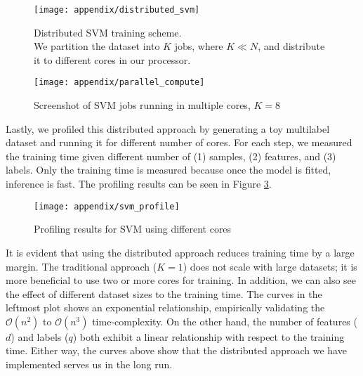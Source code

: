 \begin{figure}[t]
  \centering
    \texttt{[image: appendix/distributed\_svm]}
    \caption[Distributed SVM training scheme]{Distributed SVM training
        scheme.\\ We partition the dataset into $K$ jobs, where $K\ll N$, and
    distribute it to different cores in our processor.}
  \label{demo:distributed_svm}
\end{figure}

\begin{figure}[!h]
  \centering
    \texttt{[image: appendix/parallel\_compute]}
    \caption[Screenshot of SVM jobs running in multiple cores]{Screenshot of
    SVM jobs running in multiple cores, $K=8$}
  \label{demo:screenshot}
\end{figure}

\par Lastly, we profiled this distributed approach by generating a toy multilabel
dataset and running it for different number of cores. For each step, we
measured the training time given different number of (1) samples, (2) features,
and (3) labels. Only the training time is measured because once the model is
fitted, inference is fast. The profiling results can be seen in Figure
\ref{demo:svm_profile}.

\begin{figure}[!t]
  \centering
    \texttt{[image: appendix/svm\_profile]}
    \caption{Profiling results for SVM using different cores}
  \label{demo:svm_profile}
\end{figure}

\par It is evident that using the distributed approach reduces training time by
a large margin. The traditional approach ($K=1$) does not scale with large
datasets; it is more beneficial to use two or more cores for training. In
addition, we can also see the effect of different dataset sizes to the training
time. The curves in the leftmost plot shows an exponential relationship,
empirically validating the $\mathcal{O}(n^2)$ to $\mathcal{O}(n^3)$
time-complexity. On the other hand, the number of features ($d$) and labels
($q$) both exhibit a linear relationship with respect to the training time.
Either way, the curves above show that the distributed approach we have
implemented serves us in the long run. 
